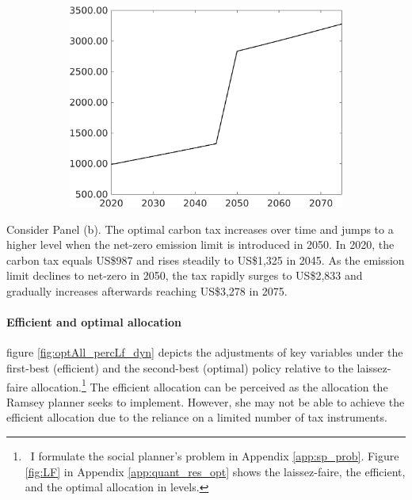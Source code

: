 \begin{figure}[h!!]
\begin{subfigure}{0.4\textwidth}
		\includegraphics[width=1\textwidth]{../../codding_model/own_basedOnFried/optimalPol_010922_revision/figures/all_13Sept22_Tplus30/Single_periods12_OPT_T_NoTaus_Tauf_regime4_spillover0_knspil0_noskill0_sep0_xgrowth0_extern0_PV1_sizeequ0_GOV0_etaa0.79.png}
	\end{subfigure}
\end{figure} 
Consider Panel (b). The optimal carbon tax increases over time and jumps to a higher level when the net-zero emission limit is introduced in 2050.
In 2020, the carbon tax equals US\$987 and rises steadily to US\$1,325 in 2045.  As the emission limit declines to net-zero in 2050, the tax rapidly surges to US\$2,833 and gradually increases afterwards reaching US\$3,278 in 2075. 
\paragraph{Efficient and optimal allocation}\label{subsec:notaul}

figure \ref{fig:optAll_percLf_dyn} depicts the adjustments of key variables under the first-best (efficient) and the second-best (optimal) policy relative to the laissez-faire allocation.\footnote{\ I formulate the social planner's problem in Appendix \ref{app:sp_prob}.  Figure \ref{fig:LF} in Appendix \ref{app:quant_res_opt} shows the laissez-faire, the efficient, and the optimal allocation in levels.} 
The efficient allocation can be perceived as the allocation the Ramsey planner seeks to implement. However, she may not be able to achieve the efficient allocation due to the reliance on a limited number of tax instruments.

